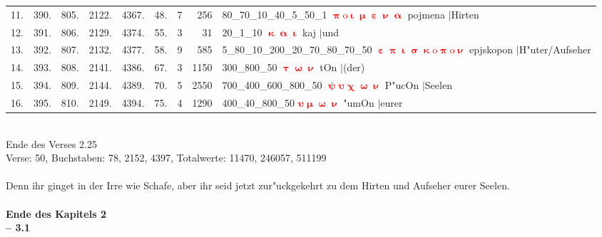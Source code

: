 \documentclass[a4paper,10pt,landscape]{article}
\begin{document}
\begin{tabular}{rrrrrrrrp{120mm}}
11.&390.&805.&2122.&4367.&48.&7&256&80\_70\_10\_40\_5\_50\_1 \textcolor{red}{$\boldsymbol{\uppi\mathrm{o}\upiota\upmu\upepsilon\upnu\upalpha}$} pojmena $|$Hirten\\
12.&391.&806.&2129.&4374.&55.&3&31&20\_1\_10 \textcolor{red}{$\boldsymbol{\upkappa\upalpha\upiota}$} kaj $|$und\\
13.&392.&807.&2132.&4377.&58.&9&585&5\_80\_10\_200\_20\_70\_80\_70\_50 \textcolor{red}{$\boldsymbol{\upepsilon\uppi\upiota\upsigma\upkappa\mathrm{o}\uppi\mathrm{o}\upnu}$} epjskopon $|$H"uter/Aufseher\\
14.&393.&808.&2141.&4386.&67.&3&1150&300\_800\_50 \textcolor{red}{$\boldsymbol{\uptau\upomega\upnu}$} tOn $|$(der)\\
15.&394.&809.&2144.&4389.&70.&5&2550&700\_400\_600\_800\_50 \textcolor{red}{$\boldsymbol{\uppsi\upsilon\upchi\upomega\upnu}$} P"ucOn $|$Seelen\\
16.&395.&810.&2149.&4394.&75.&4&1290&400\_40\_800\_50 \textcolor{red}{$\boldsymbol{\upsilon\upmu\upomega\upnu}$} "umOn $|$eurer\\
\end{tabular}\medskip \\
Ende des Verses 2.25\\
Verse: 50, Buchstaben: 78, 2152, 4397, Totalwerte: 11470, 246057, 511199\\
\\
Denn ihr ginget in der Irre wie Schafe, aber ihr seid jetzt zur"uckgekehrt zu dem Hirten und Aufseher eurer Seelen.\\
\\
{\bf Ende des Kapitels 2}\\
\newpage 
{\bf -- 3.1}\\
\medskip \\
\end{document}
